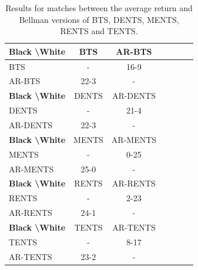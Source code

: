     \begin{table}[tbp]
    \centering
        \begin{tabular}{l|cccccc}
            \textbf{Black \textbackslash White} & BTS     & AR-BTS   \\ 
            \hline                    
                BTS             &   -       & 16-9    \\
                AR-BTS          & 22-3      &   -     \\      
            \hline
            \textbf{Black \textbackslash White} & DENTS     & AR-DENTS   \\ 
            \hline
                DENTS           &   -       & 21-4      \\
                AR-DENTS        & 22-3      & -         \\  
            \hline
            \textbf{Black \textbackslash White} & MENTS     & AR-MENTS   \\ 
            \hline
                MENTS           &   -       & 0-25      \\
                AR-MENTS        & 25-0      &   -       \\            
            \hline
            \textbf{Black \textbackslash White} & RENTS     & AR-RENTS  \\ 
            \hline
                RENTS           &   -       & 2-23      \\
                AR-RENTS        & 24-1      &   -       \\        
            \hline
            \textbf{Black \textbackslash White} & TENTS & AR-TENTS   \\ 
            \hline
                TENTS           &   -       & 8-17      \\
                AR-TENTS        & 23-2      & -         \\         
        \end{tabular}
        \caption{Results for matches between the average return and Bellman versions of BTS, DENTS, MENTS, RENTS and TENTS.\label{tab:y10}}
    \end{table}
    
    


